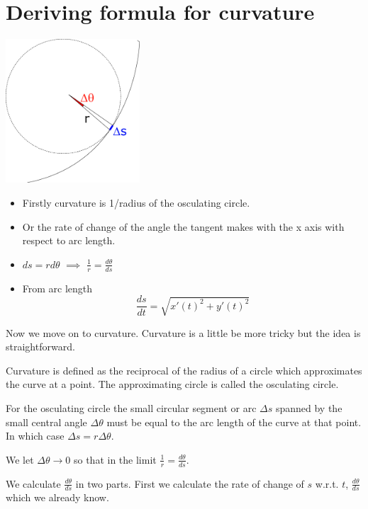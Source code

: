 \documentclass[12pt]{article} %
\theoremstyle{definition}
\theoremstyle{theorem}
\begin{document}
\section{Deriving formula for curvature}
\begin{tcolorbox}
	\begin{minipage}{\linewidth}
	\centering
		\centering
		\includegraphics[width=50mm, scale=0.4]{curvature_illustration.png}
	\end{minipage}
	\begin{itemize}
		\item Firstly curvature is 1/radius of the osculating circle.
		\item Or the rate of change of the angle the tangent makes with the x axis with respect to arc length.
		\item $ds=rd\theta$ $\implies$ $\frac{1}{r}=\frac{d\theta}{ds}$	
		\item From arc length 
		\begin{equation} \label{eq:1}
			\frac{ds}{dt} = \sqrt{x'(t)^2+y'(t)^2} 
		\end{equation}
	\end{itemize}
\end{tcolorbox}

Now we move on to curvature. Curvature is a little be more tricky but the idea is straightforward.

Curvature is defined as the reciprocal of the radius of a circle which approximates the curve at a point. The approximating circle is called the osculating circle.

For the osculating circle the small circular segment or arc $\Delta s$ spanned by the small central angle $\Delta \theta$ must be equal to the arc length of the curve at that point. In which case $\Delta s = r \Delta \theta$.

We let $\Delta \theta \to 0$ so that in the limit $\frac{1}{r}=\frac{d\theta}{ds}$.

We calculate $\frac{d\theta}{ds}$ in two parts. First we calculate the rate of change of $s$ w.r.t. $t$, $\frac{d\theta}{ds}$ which we already know.
\end{document}
